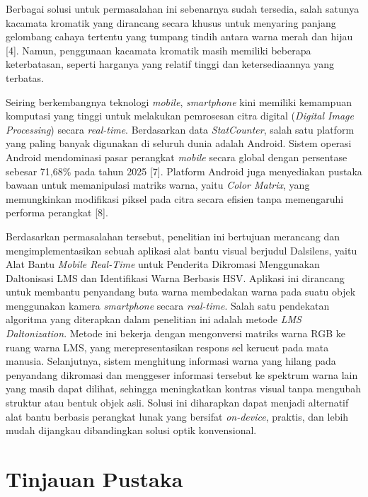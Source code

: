 Berbagai solusi untuk permasalahan ini sebenarnya sudah tersedia, salah satunya kacamata kromatik yang dirancang secara khusus untuk menyaring panjang gelombang cahaya tertentu yang tumpang tindih antara warna merah dan hijau [4]. Namun, penggunaan kacamata kromatik masih memiliki beberapa keterbatasan, seperti harganya yang relatif tinggi dan ketersediaannya yang terbatas.

Seiring berkembangnya teknologi \textit{mobile}, \textit{smartphone} kini memiliki kemampuan komputasi yang tinggi untuk melakukan pemrosesan citra digital (\textit{Digital Image Processing}) secara \textit{real-time}. Berdasarkan data \textit{StatCounter}, salah satu platform yang paling banyak digunakan di seluruh dunia adalah Android. Sistem operasi Android mendominasi pasar perangkat \textit{mobile} secara global dengan persentase sebesar 71,68\% pada tahun 2025 [7]. Platform Android juga menyediakan pustaka bawaan untuk memanipulasi matriks warna, yaitu \textit{Color Matrix}, yang memungkinkan modifikasi piksel pada citra secara efisien tanpa memengaruhi performa perangkat [8].

Berdasarkan permasalahan tersebut, penelitian ini bertujuan merancang dan mengimplementasikan sebuah aplikasi alat bantu visual berjudul Dalsilens, yaitu Alat Bantu \textit{Mobile Real-Time} untuk Penderita Dikromasi Menggunakan Daltonisasi LMS dan Identifikasi Warna Berbasis HSV. Aplikasi ini dirancang untuk membantu penyandang buta warna membedakan warna pada suatu objek menggunakan kamera \textit{smartphone} secara \textit{real-time}. Salah satu pendekatan algoritma yang diterapkan dalam penelitian ini adalah metode \textit{LMS Daltonization}. Metode ini bekerja dengan mengonversi matriks warna RGB ke ruang warna LMS, yang merepresentasikan respons sel kerucut pada mata manusia. Selanjutnya, sistem menghitung informasi warna yang hilang pada penyandang dikromasi dan menggeser informasi tersebut ke spektrum warna lain yang masih dapat dilihat, sehingga meningkatkan kontras visual tanpa mengubah struktur atau bentuk objek asli. Solusi ini diharapkan dapat menjadi alternatif alat bantu berbasis perangkat lunak yang bersifat \textit{on-device}, praktis, dan lebih mudah dijangkau dibandingkan solusi optik konvensional.

\section{Tinjauan Pustaka}

